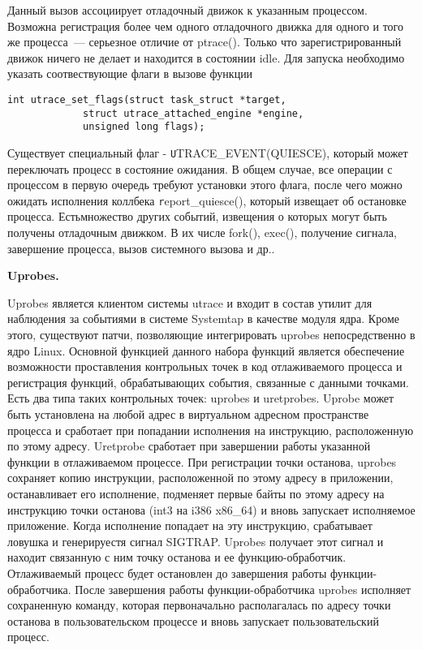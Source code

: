 \bigskip 
Данный вызов ассоциирует отладочный движок к указанным процессом. 
Возможна регистрация более чем одного отладочного движка для 
одного и того же процесса~--- серьезное отличие от ptrace(). 
Только что зарегистрированный движок ничего не делает и 
находится в состоянии idle. Для запуска необходимо указать 
соотвествующие флаги в вызове функции 

\bigskip
\begin{lstlisting}
int utrace_set_flags(struct task_struct *target,
			 struct utrace_attached_engine *engine,
			 unsigned long flags);

\end{lstlisting}

\bigskip 
Существует специальный флаг - {\texttt UTRACE\_EVENT(QUIESCE)}, 
который может переключать процесс в состояние ожидания. В общем 
случае, все операции с процессом в первую очередь требуют 
установки этого флага, после чего можно ожидать исполнения 
коллбека {\texttt report\_quiesce()}, который извещает об 
остановке процесса. Естьмножество других событий, извещения 
о которых могут быть получены отладочным движком. В их числе 
fork(), exec(), получение сигнала, завершение процесса, вызов 
системного вызова и др..

\bigskip
{\bfseries Uprobes.}

\bigskip
Uprobes является клиентом системы utrace и входит в состав утилит для 
наблюдения за событиями в системе Systemtap в качестве модуля ядра. 
Кроме этого, существуют патчи, позволяющие интегрировать uprobes 
непосредственно в ядро Linux. Основной функцией данного набора функций 
является обеспечение возможности проставления контрольных точек в код 
отлаживаемого процесса и регистрация функций, обрабатывающих события, 
связанные с данными точками. Есть два типа таких контрольных точек: 
uprobes и uretprobes. Uprobe может быть установлена на любой адрес в 
виртуальном адресном пространстве процесса и сработает при попадании 
исполнения на инструкцию, расположенную по этому адресу. Uretprobe 
сработает при завершении работы указанной функции в отлаживаемом 
процессе. При регистрации точки останова, uprobes сохраняет копию 
инструкции, расположенной по этому адресу в приложении, останавливает 
его исполнение, подменяет первые байты по этому адресу на инструкцию 
точки останова (int3 на i386 x86\_64) и вновь запускает исполняемое 
приложение. Когда исполнение попадает на эту инструкцию, срабатывает 
ловушка и генерируестя сигнал SIGTRAP. Uprobes получает этот сигнал и 
находит связанную с ним точку останова и ее функцию-обработчик. 
Отлаживаемый процесс будет остановлен до завершения работы 
функции-обработчика. После завершения работы функции-обработчика uprobes 
исполняет сохраненную команду, которая первоначально располагалась 
по адресу точки останова в пользовательском процессе и вновь запускает 
пользовательский процесс.   

